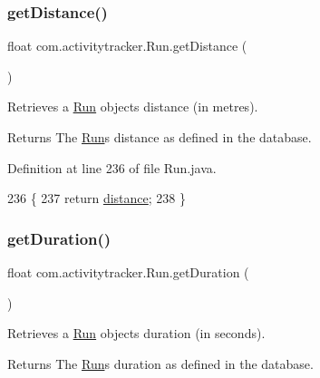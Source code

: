 \subsubsection{\texorpdfstring{get\+Distance()}{getDistance()}}
{\footnotesize\ttfamily float com.\+activitytracker.\+Run.\+get\+Distance (\begin{DoxyParamCaption}{ }\end{DoxyParamCaption})}

Retrieves a \mbox{\hyperlink{classcom_1_1activitytracker_1_1_run}{Run}} object\textquotesingle{}s distance (in metres).

\begin{DoxyReturn}{Returns}
The \mbox{\hyperlink{classcom_1_1activitytracker_1_1_run}{Run}}\textquotesingle{}s distance as defined in the database. 
\end{DoxyReturn}


Definition at line 236 of file Run.\+java.


\begin{DoxyCode}
236                                \{
237         \textcolor{keywordflow}{return} \mbox{\hyperlink{classcom_1_1activitytracker_1_1_run_a7b4ca8c4ecea4da1653f03b8c8fc16a8}{distance}};
238     \}
\end{DoxyCode}
\mbox{\label{classcom_1_1activitytracker_1_1_run_af0d3f62a282a94fe74a1bdfa0c3dc277}} 
\subsubsection{\texorpdfstring{get\+Duration()}{getDuration()}}
{\footnotesize\ttfamily float com.\+activitytracker.\+Run.\+get\+Duration (\begin{DoxyParamCaption}{ }\end{DoxyParamCaption})}

Retrieves a \mbox{\hyperlink{classcom_1_1activitytracker_1_1_run}{Run}} object\textquotesingle{}s duration (in seconds).

\begin{DoxyReturn}{Returns}
The \mbox{\hyperlink{classcom_1_1activitytracker_1_1_run}{Run}}\textquotesingle{}s duration as defined in the database. 
\end{DoxyReturn}


